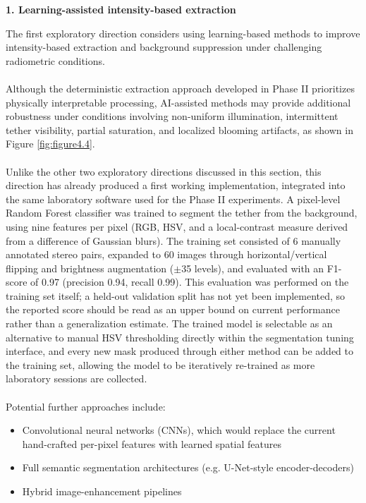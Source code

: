 \noindent \textbf{1. Learning-assisted intensity-based extraction}
\vspace{0.2cm}

The first exploratory direction considers using learning-based methods to improve intensity-based extraction and background suppression under challenging radiometric conditions.
\\\\
Although the deterministic extraction approach developed in Phase II prioritizes physically interpretable processing, AI-assisted methods may provide additional robustness under conditions involving non-uniform illumination, intermittent tether visibility, partial saturation, and localized blooming artifacts, as shown in Figure \ref{fig:figure4.4}.
\\\\
Unlike the other two exploratory directions discussed in this section, this direction has already produced a first working implementation, integrated into the same laboratory software used for the Phase II experiments. A pixel-level Random Forest classifier was trained to segment the tether from the background, using nine features per pixel (RGB, HSV, and a local-contrast measure derived from a difference of Gaussian blurs). The training set consisted of 6 manually annotated stereo pairs, expanded to 60 images through horizontal/vertical flipping and brightness augmentation ($\pm$35 levels), and evaluated with an F1-score of 0.97 (precision 0.94, recall 0.99). This evaluation was performed on the training set itself; a held-out validation split has not yet been implemented, so the reported score should be read as an upper bound on current performance rather than a generalization estimate. The trained model is selectable as an alternative to manual HSV thresholding directly within the segmentation tuning interface, and every new mask produced through either method can be added to the training set, allowing the model to be iteratively re-trained as more laboratory sessions are collected.
\\\\
Potential further approaches include:

\begin{itemize}
    \item Convolutional neural networks (CNNs), which would replace the current hand-crafted per-pixel features with learned spatial features
    \item Full semantic segmentation architectures (e.g. U-Net-style encoder-decoders)
    \item Hybrid image-enhancement pipelines
\end{itemize}

